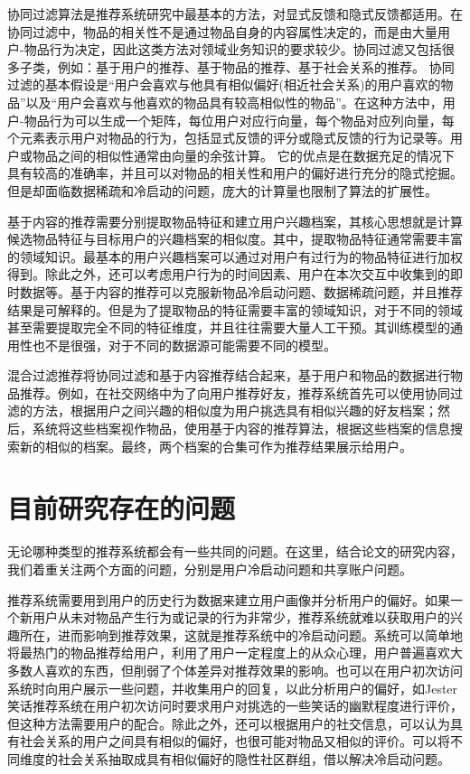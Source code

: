 协同过滤算法是推荐系统研究中最基本的方法，对显式反馈和隐式反馈都适用。在协同过滤中，物品的相关性不是通过物品自身的内容属性决定的，而是由大量用户-物品行为决定，因此这类方法对领域业务知识的要求较少。协同过滤又包括很多子类，例如：基于用户的推荐\parencite{babu2011implementation}、基于物品的推荐\parencite{sarwar2001item,linden2003amazon}、基于社会关系的推荐\parencite{asabere2015socially,massa2007trust}。
协同过滤的基本假设是“用户会喜欢与他具有相似偏好(相近社会关系)的用户喜欢的物品”以及“用户会喜欢与他喜欢的物品具有较高相似性的物品”。在这种方法中，用户-物品行为可以生成一个矩阵，每位用户对应行向量，每个物品对应列向量，每个元素表示用户对物品的行为，包括显式反馈的评分或隐式反馈的行为记录等。用户或物品之间的相似性通常由向量的余弦\parencite{goshtasby2012similarity}计算。
它的优点是在数据充足的情况下具有较高的准确率，并且可以对物品的相关性和用户的偏好进行充分的隐式挖掘。但是却面临数据稀疏和冷启动的问题，庞大的计算量也限制了算法的扩展性。
		
基于内容的推荐需要分别提取物品特征和建立用户兴趣档案，其核心思想就是计算候选物品特征与目标用户的兴趣档案的相似度。其中，提取物品特征通常需要丰富的领域知识。最基本的用户兴趣档案可以通过对用户有过行为的物品特征进行加权得到。除此之外，还可以考虑用户行为的时间因素、用户在本次交互中收集到的即时数据等。基于内容的推荐可以克服新物品冷启动问题、数据稀疏问题，并且推荐结果是可解释的。但是为了提取物品的特征需要丰富的领域知识，对于不同的领域甚至需要提取完全不同的特征维度，并且往往需要大量人工干预。其训练模型的通用性也不是很强，对于不同的数据源可能需要不同的模型。

混合过滤推荐将协同过滤和基于内容推荐结合起来，基于用户和物品的数据进行物品推荐。例如，在社交网络中为了向用户推荐好友\parencite{portugal2015use}，推荐系统首先可以使用协同过滤的方法，根据用户之间兴趣的相似度为用户挑选具有相似兴趣的好友档案；然后，系统将这些档案视作物品，使用基于内容的推荐算法，根据这些档案的信息搜索新的相似的档案。最终，两个档案的合集可作为推荐结果展示给用户。

\section{目前研究存在的问题}

无论哪种类型的推荐系统都会有一些共同的问题。在这里，结合论文的研究内容，我们着重关注两个方面的问题，分别是用户冷启动问题\parencite{schein2002methods}和共享账户问题\parencite{weston2013nonlinear}。

推荐系统需要用到用户的历史行为数据来建立用户画像并分析用户的偏好。如果一个新用户从未对物品产生行为或记录的行为非常少，推荐系统就难以获取用户的兴趣所在，进而影响到推荐效果，这就是推荐系统中的冷启动问题。系统可以简单地将最热门\parencite{sun2012survey}的物品推荐给用户，利用了用户一定程度上的从众心理，用户普遍喜欢大多数人喜欢的东西，但削弱了个体差异对推荐效果的影响。也可以在用户初次访问系统时向用户展示一些问题，并收集用户的回复，以此分析用户的偏好，如Jester\parencite{goldberg2001eigentaste}笑话推荐系统在用户初次访问时要求用户对挑选的一些笑话的幽默程度进行评价，但这种方法需要用户的配合。除此之外，还可以根据用户的社交信息\parencite{sedhain2014social}，可以认为具有社会关系的用户之间具有相似的偏好，也很可能对物品又相似的评价。可以将不同维度的社会关系抽取成具有相似偏好的隐性社区群组\parencite{sahebi2011community}，借以解决冷启动问题。

